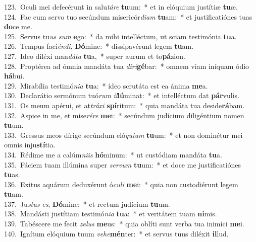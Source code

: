 {123.~}Oculi mei defecérunt in salu\textit{tá}\textit{re} \textbf{tu}um:~* et in elóquium justítiæ \textbf{tu}æ.\\
{124.~}Fac cum servo tuo secúndum misericór\textit{di}\textit{am} \textbf{tu}am:~* et justificatiónes tuas \textbf{do}ce me.\\
{125.~}Servus tu\textit{us} \textit{sum} \textbf{e}go:~* da mihi intelléctum, ut sciam testimónia \textbf{tu}a.\\
{126.~}Tempus faci\textit{én}\textit{di}, \textbf{Dó}mine:~* dissipavérunt legem \textbf{tu}am.\\
{127.~}Ideo diléxi man\textit{dá}\textit{ta} \textbf{tu}a,~* super aurum et to\textbf{pá}zion.\\
{128.~}Proptérea ad ómnia mandáta tua \textit{di}\textit{ri}\textbf{gé}bar:~* omnem viam iníquam ódio \textbf{há}bui.\\
{129.~}Mirabília testimó\textit{ni}\textit{a} \textbf{tu}a:~* ídeo scrutáta est ea ánima \textbf{me}a.\\
{130.~}Declarátio sermónum tuó\textit{rum} \textit{il}\textbf{lú}minat:~* et intelléctum dat \textbf{pár}vulis.\\
{131.~}Os meum apérui, et at\textit{trá}\textit{xi} \textbf{spí}ritum:~* quia mandáta tua deside\textbf{rá}bam.\\
{132.~}Aspice in me, et mise\textit{ré}\textit{re} \textbf{me}i:~* secúndum judícium diligéntium nomen \textbf{tu}um.\\
{133.~}Gressus meos dírige secúndum eló\textit{qui}\textit{um} \textbf{tu}um:~* et non dominétur mei omnis inju\textbf{stí}tia.\\
{134.~}Rédime me a calúm\textit{ni}\textit{is} \textbf{hó}minum:~* ut custódiam mandáta \textbf{tu}a.\\
{135.~}Fáciem tuam illúmina super \textit{ser}\textit{vum} \textbf{tu}um:~* et doce me justificatiónes \textbf{tu}as.\\
{136.~}Exitus aquárum deduxérunt ó\textit{cu}\textit{li} \textbf{me}i:~* quia non custodiérunt legem \textbf{tu}am.\\
{137.~}Ju\textit{stus} \textit{es}, \textbf{Dó}mine:~* et rectum judícium \textbf{tu}um.\\
{138.~}Mandásti justítiam testimó\textit{ni}\textit{a} \textbf{tu}a:~* et veritátem tuam \textbf{ni}mis.\\
{139.~}Tabéscere me fecit \textit{ze}\textit{lus} \textbf{me}us:~* quia oblíti sunt verba tua inimíci \textbf{me}i.\\
{140.~}Ignítum elóquium tuum \textit{ve}\textit{he}\textbf{mén}ter:~* et servus tuus diléxit \textbf{il}lud.\\
